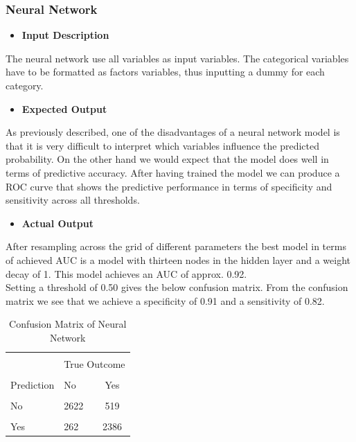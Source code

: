   	\subsubsection{Neural Network}
  	\begin{itemize}
  		\item \textbf{Input Description}
  	\end{itemize}
  	\noindent The neural network use all variables as input variables. The categorical variables have to be formatted as factors variables, thus inputting a dummy for each category. 
  	\begin{itemize}
  		\item \textbf{Expected Output}
  	\end{itemize}
  	As previously described, one of the disadvantages of a neural network model is that it is very difficult to interpret which variables influence the predicted probability. On the other hand we would expect that the model does well in terms of predictive accuracy. After having trained the model we can produce a ROC curve that shows the predictive performance in terms of specificity and sensitivity across all thresholds.\\   
  	\begin{itemize}
  		\item \textbf{Actual Output}
  	\end{itemize}
  	\noindent After resampling across the grid of different parameters the best model in terms of achieved AUC is a model with thirteen nodes in the hidden layer and a weight decay of 1. This model achieves an AUC of approx. 0.92.\\
  	Setting a threshold of 0.50 gives the below confusion matrix. From the confusion matrix we see that we achieve a specificity of 0.91 and a sensitivity of 0.82.

\begin{center}
\begin{table}[!htbp]
	\centering  
	\begin{tabular}{llc}
		\hline
		\hline\\[-1.8ex]
		& \multicolumn{2}{c}{True Outcome} \\
		\cline{2-3}\\[-1.8ex]
		Prediction & No & Yes \\
		\hline \\[-1.8ex] 
		No & 2622 & 519 \\ 
		\hline \\[-1.8ex] 
		Yes& 262 & 2386\\ 
		\hline
		\hline
	\end{tabular}  
	\caption{Confusion Matrix of Neural Network} 
\end{table}
\end{center}
 
